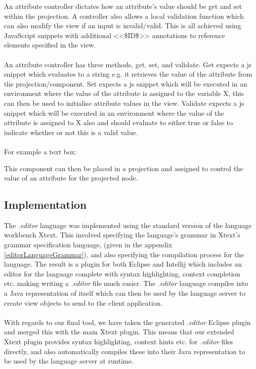 \documentclass{article}
\begin{document}
An attribute controller dictates how an attribute's value should be get and set within the projection. A controller also allows a local validation function which can also modify the view if an input is invalid/valid. This is all achieved using JavaScript snippets with additional <<\$ID\$>> annotations to reference elements specified in the view.
\\
\\
An attribute controller has three methods, get, set, and validate. Get expects a js snippet which evaluates to a string e.g. it retrieves the value of the attribute from the projection/component. Set expects a js snippet which will be executed in an environment where the value of the attribute is assigned to the variable X, this can then be used to initialise attribute values in the view. Validate expects a js snippet which will be executed in an environment where the value of the attribute is assigned to X also and should evaluate to either true or false to indicate whether or not this is a valid value. 
\\
\\
For example a text box: 

This component can then be placed in a projection and assigned to control the value of an attribute for the projected node.

\subsection{Implementation}
The \emph{.editor} language was implemented using the standard version of the language workbench Xtext. This involved specifying the language's grammar in Xtext's grammar specification language, (given in the appendix \ref{editorLanguageGrammar}), and also specifying the compilation process for the language. The result is a plugin for both Eclipse and Intellij which includes an editor for the language complete with syntax highlighting, context completion etc. making writing a \emph{.editor} file much easier. The \emph{.editor} language compiles into a Java representation of itself which can then be used by the language server to create view objects to send to the client application.
\\
\\
With regards to our final tool, we have taken the generated \emph{.editor} Eclipse plugin and merged this with the main Xtext plugin. This means that our extended Xtext plugin provides syntax highlighting, context hints etc. for \emph{.editor} files directly, and also automatically compiles these into their Java representation to be used by the language server at runtime.
\end{document}
